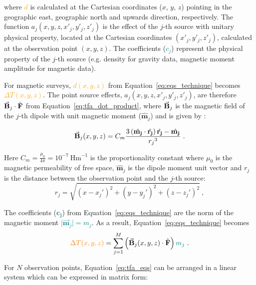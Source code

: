 \noindent
where \textcolor{orange}{$d$} is calculated at the Cartesian coordinates ($x$, $y$, $z$) pointing in the geographic east, geographic north and upwards direction, respectively. The function $a_j(x, y, z, x'_j, y'_j , z'_j)$ is the effect of the $j$-th source with unitary physical property, located at the Cartesian coordinates $(x'_j, y'_j, z'_j)$, calculated at the observation point $(x, y, z)$. The coefficients (\textcolor{teal}{$c_j$}) represent the physical property of the $j$-th source
(e.g. density for gravity data, magnetic moment amplitude for magnetic data).

For magnetic surveys, \textcolor{orange}{$d (x, y, z)$} from Equation~\ref{eq:eqs_technique} becomes \textcolor{orange}{$\Delta T(x, y, z)$}. The point source effects, $a_j(x, y, z, x'_j, y'_j , z'_j)$, are therefore $\vec{\mathbf{B}}_j \cdot \hat{\mathbf{F}}$ from Equation~\ref{eq:tfa_dot_product}, where $\vec{\mathbf{B}}_j$ is the magnetic field of the $j$-th dipole with unit magnetic moment ($\hat{\mathbf{m}}_j$) and is given by \citep{Blakley1995}:

\begin{equation}
    \vec{\mathbf{B}}_j (x, y, z) = C_m \dfrac{3 \left( \hat{\mathbf{m_j}} \cdot \hat{\mathbf{r_j}} \right) \hat{\mathbf{r_j}} - \hat{\mathbf{m_j}}}{{r_j}^3}
    \ .
    \label{eq:magnetic_field}
\end{equation}

\noindent
Here $C_m = \frac{\mu_0}{4 \pi} = 10^{-7} \ \text{Hm}^{-1}$ is the proportionality constant where $\mu_0$ is the magnetic permeability of free space, $\hat{\mathbf{m}}_j$ is the dipole moment unit vector and $r_j$ is the distance between the observation point and the $j$-th source:
\begin{equation}
    r_j = \sqrt{(x - x_j')^2 + (y - y_j')^2 + (z - z_j')^2}
    \ ,
\end{equation}


The coefficients (\textcolor{teal}{$\mathbf{c_j}$}) from Equation~\ref{eq:eqs_technique} are the norm of the magnetic moment \textcolor{teal}{$\vert \vec{\mathbf{m}}_j \vert = m_j$}. As a result, Equation~\ref{eq:eqs_technique} becomes
\begin{equation}
\label{eq:tfa_eqs}
\textcolor{orange}{\Delta T (x, y, z)} = \sum_{j=1}^{M} \left(\vec{\mathbf{B}}_j(x, y, z) \cdot \hat{\mathbf{F}}\right) \textcolor{teal}{m_j}
\ .
\end{equation}

For $N$ observation points, Equation~\ref{eq:tfa_eqs} can be arranged in a linear system which can be expressed in matrix form:

